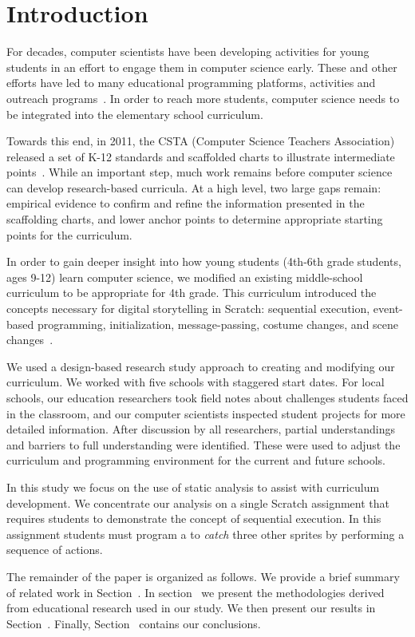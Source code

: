 \section{Introduction}
For decades, computer scientists have been developing activities for young
students in an effort to engage them in computer science early. These and other
efforts have led to many educational programming platforms, activities and
outreach programs~\cite{wayanoutpost, georgiaoutreach,
Franklin:2011:ATA:1953163.1953295, Maloney:2010:SPL:1868358.1868363,
Dann:2000:MCP:343048.343070, Hood:2005:TPL:1067445.1067454, csunplugged}. In
order to reach more students, computer science needs to be integrated into the
elementary school curriculum.

Towards this end, in 2011, the CSTA (Computer Science Teachers Association)
released a set of K-12 standards and scaffolded charts to illustrate
intermediate points~\cite{cstastandards}. While an important step, much work
remains before computer science can develop research-based curricula. At a
high level, two large gaps remain: empirical evidence to confirm and refine the
information presented in the scaffolding charts, and lower anchor points to
determine appropriate starting points for the curriculum.

In order to gain deeper insight into how young students (4th-6th grade
students, ages 9-12) learn computer science, we modified an existing
middle-school curriculum to be appropriate for 4th grade. This curriculum
introduced the concepts necessary for digital storytelling in Scratch:
sequential execution, event-based programming, initialization, message-passing,
costume changes, and scene changes~\cite{Franklin:2013:SBO}.

We used a design-based research study approach to creating and modifying our
curriculum. We worked with five schools with staggered start dates. For local
schools, our education researchers took field notes about challenges students
faced in the classroom, and our computer scientists inspected student projects
for more detailed information. After discussion by all researchers, partial
understandings and barriers to full understanding were identified. These were
used to adjust the curriculum and programming environment for the current and
future schools.

In this study we focus on the use of static analysis to assist with curriculum
development. We concentrate our analysis on a single Scratch assignment that
requires students to demonstrate the concept of sequential execution. In this
assignment students must program a \net{} to \emph{catch} three other sprites
by performing a sequence of actions.

The remainder of the paper is organized as follows. We provide a brief summary
of related work in Section~. In
section~ we present the methodologies derived from
educational research used in our study. We then present our results in
Section~. Finally, Section~
contains our conclusions.
